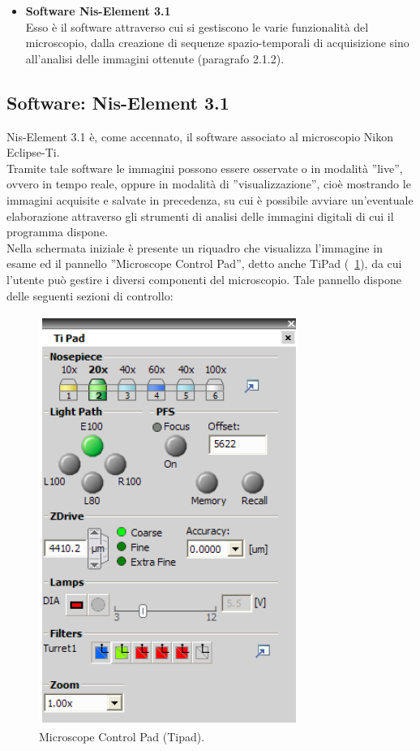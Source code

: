 \begin{itemize}
\item \textbf{Software Nis-Element 3.1}\\
Esso è il software attraverso cui si gestiscono le varie funzionalità del microscopio, dalla creazione di sequenze spazio-temporali di acquisizione sino all'analisi delle immagini ottenute (paragrafo 2.1.2).

\end{itemize}

\subsection{Software: Nis-Element 3.1}

Nis-Element 3.1 è, come accennato, il software associato al microscopio Nikon Eclipse-Ti.\\
Tramite tale software le immagini possono essere osservate o in modalità ''live'', ovvero in tempo reale, oppure in modalità di ''visualizzazione'', cioè mostrando le immagini acquisite e salvate in precedenza, su cui è possibile avviare un'eventuale elaborazione attraverso gli strumenti di analisi delle immagini digitali di cui il programma dispone.\\
Nella schermata iniziale è presente un riquadro che visualizza l'immagine in esame ed il pannello ''Microscope Control Pad'', detto anche TiPad (\figurename~\ref{fig:pannello}), da cui l'utente può gestire i diversi componenti del microscopio. Tale pannello dispone delle seguenti sezioni di controllo:

\begin{figure}[!ht]
 \centering
 \includegraphics[scale=.40]{img/CAP2pannello.png}
 \caption{\small{Microscope Control Pad (Tipad).}}
 \label{fig:pannello}
\end{figure}


